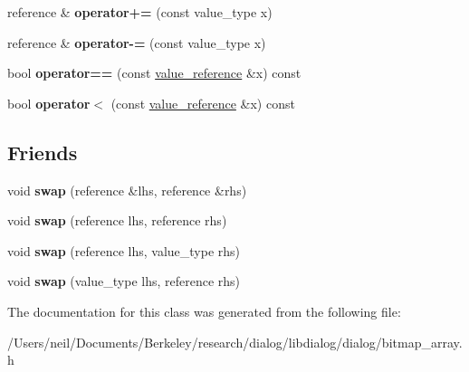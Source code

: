 \begin{DoxyCompactItemize}
reference \& {\bfseries operator+=} (const value\+\_\+type x)
\item 
\mbox{\label{classdialog_1_1value__reference_a2e48dec1b47f0d18e5cf119c844b705c}} 
reference \& {\bfseries operator-\/=} (const value\+\_\+type x)
\item 
\mbox{\label{classdialog_1_1value__reference_a2810637b20e5d4238e97676c2cab040e}} 
bool {\bfseries operator==} (const \hyperlink{classdialog_1_1value__reference}{value\+\_\+reference} \&x) const
\item 
\mbox{\label{classdialog_1_1value__reference_a1d7862331b1ff41767f5ee018a34096d}} 
bool {\bfseries operator$<$} (const \hyperlink{classdialog_1_1value__reference}{value\+\_\+reference} \&x) const
\end{DoxyCompactItemize}
\subsection*{Friends}
\begin{DoxyCompactItemize}
\item 
\mbox{\label{classdialog_1_1value__reference_a3a7a2a2ab6603aeee3a1a11dd439478e}} 
void {\bfseries swap} (reference \&lhs, reference \&rhs)
\item 
\mbox{\label{classdialog_1_1value__reference_ad4d54bcde1a3a6f0eea00d89fc6a4cf1}} 
void {\bfseries swap} (reference lhs, reference rhs)
\item 
\mbox{\label{classdialog_1_1value__reference_aa3f938ae8e5b8424dbd87a0b86173e63}} 
void {\bfseries swap} (reference lhs, value\+\_\+type rhs)
\item 
\mbox{\label{classdialog_1_1value__reference_aacb6a5420477c2c9ce958d0dfe140641}} 
void {\bfseries swap} (value\+\_\+type lhs, reference rhs)
\end{DoxyCompactItemize}


The documentation for this class was generated from the following file\+:\begin{DoxyCompactItemize}
\item 
/\+Users/neil/\+Documents/\+Berkeley/research/dialog/libdialog/dialog/bitmap\+\_\+array.\+h\end{DoxyCompactItemize}

